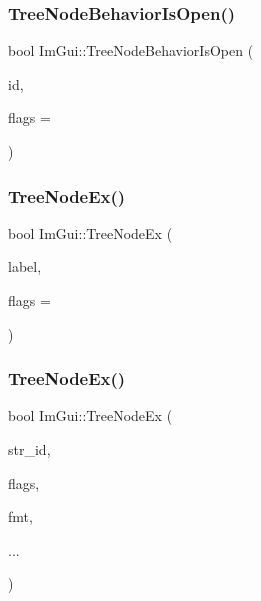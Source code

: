 \hypertarget{namespace_im_gui_a22cc50485aad6da8a3a4e156b500ed4a}{}\label{namespace_im_gui_a22cc50485aad6da8a3a4e156b500ed4a} 
\subsubsection{\texorpdfstring{Tree\+Node\+Behavior\+Is\+Open()}{TreeNodeBehaviorIsOpen()}}
{\footnotesize\ttfamily bool Im\+Gui\+::\+Tree\+Node\+Behavior\+Is\+Open (\begin{DoxyParamCaption}\item[{Im\+Gui\+ID}]{id,  }\item[{Im\+Gui\+Tree\+Node\+Flags}]{flags = {} }\end{DoxyParamCaption})}

\hypertarget{namespace_im_gui_a21f62e092dac9556a15a8edee2f70522}{}\label{namespace_im_gui_a21f62e092dac9556a15a8edee2f70522} 
\subsubsection{\texorpdfstring{Tree\+Node\+Ex()}{TreeNodeEx()}\hspace{0.1cm}{\footnotesize\ttfamily [1/3]}}
{\footnotesize\ttfamily bool Im\+Gui\+::\+Tree\+Node\+Ex (\begin{DoxyParamCaption}\item[{const char $\ast$}]{label,  }\item[{Im\+Gui\+Tree\+Node\+Flags}]{flags = {} }\end{DoxyParamCaption})}

\hypertarget{namespace_im_gui_a9ca2fae922b38cfddc3259f874c18a5d}{}\label{namespace_im_gui_a9ca2fae922b38cfddc3259f874c18a5d} 
\subsubsection{\texorpdfstring{Tree\+Node\+Ex()}{TreeNodeEx()}\hspace{0.1cm}{\footnotesize\ttfamily [2/3]}}
{\footnotesize\ttfamily bool Im\+Gui\+::\+Tree\+Node\+Ex (\begin{DoxyParamCaption}\item[{const char $\ast$}]{str\+\_\+id,  }\item[{Im\+Gui\+Tree\+Node\+Flags}]{flags,  }\item[{const char $\ast$}]{fmt,  }\item[{}]{... }\end{DoxyParamCaption})}

